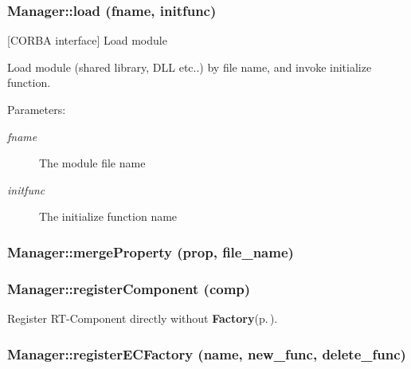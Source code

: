\subsubsection{\setlength{\rightskip}{0pt plus 5cm}Manager::load (fname, initfunc)}\label{classManager_Managera7}


[CORBA interface] Load module 

Load module (shared library, DLL etc..) by file name, and invoke initialize function.

\begin{Desc}
\item[Parameters:]
\begin{description}
\item[{\em fname}]The module file name \item[{\em initfunc}]The initialize function name\end{description}
\end{Desc}
\subsubsection{\setlength{\rightskip}{0pt plus 5cm}Manager::merge\-Property (prop, file\_\-name)}\label{classManager_Managera39}


\subsubsection{\setlength{\rightskip}{0pt plus 5cm}Manager::register\-Component (comp)}\label{classManager_Managera16}


Register RT-Component directly without {\bf Factory}{\rm (p.\,\pageref{namespaceFactory})}. 

\subsubsection{\setlength{\rightskip}{0pt plus 5cm}Manager::register\-ECFactory (name, new\_\-func, delete\_\-func)}\label{classManager_Managera13}


